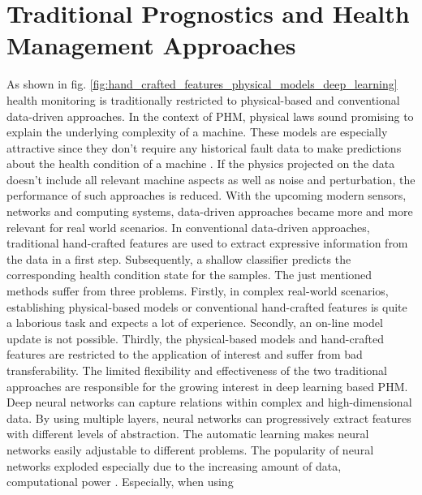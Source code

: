 \section{Traditional Prognostics and Health Management Approaches}
As shown in fig. \ref{fig:hand_crafted_features_physical_models_deep_learning} health monitoring is traditionally restricted to physical-based and conventional data-driven approaches. In the context of PHM, physical laws sound promising to explain the underlying complexity of a machine. These models are especially attractive since they don't require any historical fault data to make predictions about the health condition of a machine \cite{AN201942}. If the physics projected on the data doesn't include all relevant machine aspects as well as noise and perturbation, the performance of such approaches is reduced. With the upcoming modern sensors, networks and computing systems, data-driven approaches became more and more relevant for real world scenarios. In conventional data-driven approaches, traditional hand-crafted features are used to extract expressive information from the data in a first step. Subsequently, a shallow classifier predicts the corresponding health condition state for the samples. The just mentioned methods suffer from three problems. Firstly, in complex real-world scenarios, establishing physical-based models or conventional hand-crafted features is quite a laborious task and expects a lot of experience. Secondly, an on-line model update is not possible. Thirdly, the physical-based models and hand-crafted features are restricted to the application of interest and suffer from bad transferability. The limited flexibility and effectiveness of the two traditional approaches are responsible for the growing interest in deep learning based PHM. Deep neural networks can capture relations within complex and high-dimensional data. By using multiple layers, neural networks can progressively extract features with different levels of abstraction. The automatic learning makes neural networks easily adjustable to different problems. The popularity of neural networks exploded especially due to the increasing amount of data, computational power \cite{ZHAO2019213} \cite{AZAMFAR2020103932}. Especially, when using 

